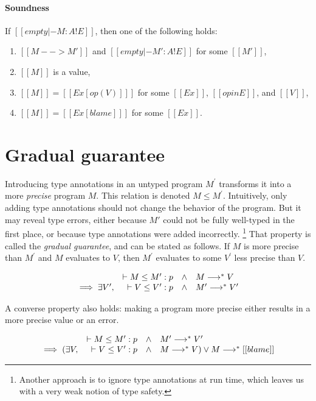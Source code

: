 \paragraph{Soundness} If $[[empty |- M : A ! E]]$, then one of the following holds:
\begin{enumerate}
 \item $[[M --> M']]$ and $[[empty |- M' : A ! E]]$ for some $[[M']]$,
 \item $[[M]]$ is a value,
 \item $[[M]] = [[Ex [ op ( V ) ] ]]$ for some $[[Ex]]$, $[[op in E]]$, and $[[V]]$,
 \item $[[M]] = [[Ex [ blame ] ]]$ for some $[[Ex]]$.
\end{enumerate}

\section{Gradual guarantee}

Introducing type annotations in an untyped program $M^\prime$ transforms it into a more \emph{precise} program $M$.
This relation is denoted $M \le M^\prime$.
Intuitively, only adding type annotations should not change the behavior of the program.
But it may reveal type errors, either because $M'$ could not be fully well-typed
in the first place, or because type annotations were added incorrectly.
\footnote{Another approach is to ignore type annotations at run time, which leaves us with a very weak notion of type safety.}
That property is called the \emph{gradual guarantee}, and can be stated as follows.
If $M$ is more precise than $M^\prime$ and $M$ evaluates to $V$,
then $M^\prime$ evaluates to some $V^\prime$ less precise than $V$.

\newcommand\wwedge{\quad\wedge\quad}

\[
\begin{array}{rrcl}
  & \vdash M \le M^\prime : p & \wedge & M \longrightarrow^\ast V
\\ \implies \exists V^\prime , & \vdash V \le V^\prime : p & \wedge & M^\prime \longrightarrow^\ast V^\prime
\end{array}
\]

A converse property also holds: making a program more precise either results in a more precise value
or an error.

\[
\begin{array}{rrcl}
  & \vdash M \le M^\prime : p & \wedge & M^\prime \longrightarrow^\ast V^\prime
  \\ \implies (\exists V , & \vdash V \le V^\prime : p & \wedge & M \longrightarrow^\ast V) \vee M \longrightarrow^\ast [[blame]]
\end{array}
\]

